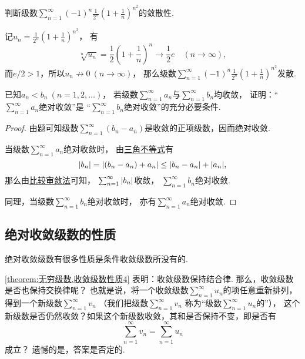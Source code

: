 \begin{example}
判断级数\(\sum_{n=1}^\infty (-1)^n \frac1{2^n} \left(1+\frac1n\right)^{n^2}\)的敛散性.
\begin{solution}
记\(u_n = \frac1{2^n} \left(1+\frac1n\right)^{n^2}\)，
有\[
	\sqrt[n]{u_n}
	= \frac12 \left(1+\frac1n\right)^n
	\to \frac12 e \quad(n\to\infty),
\]
而\(e/2>1\)，所以\(u_n \not\to 0\ (n\to\infty)\)，
那么级数\(\sum_{n=1}^\infty (-1)^n \frac1{2^n} \left(1+\frac1n\right)^{n^2}\)发散.
\end{solution}
\end{example}

\begin{example}
已知\(a_n < b_n\ (n=1,2,\dotsc)\)，
若级数\(\sum_{n=1}^\infty a_n\)与\(\sum_{n=1}^\infty b_n\)均收敛，
证明：“\(\sum_{n=1}^\infty a_n\)绝对收敛”是
“\(\sum_{n=1}^\infty b_n\)绝对收敛”的充分必要条件.
\begin{proof}
由题可知级数\(\sum_{n=1}^\infty (b_n - a_n)\)是收敛的正项级数，因而绝对收敛.

当级数\(\sum_{n=1}^\infty a_n\)绝对收敛时，
由\hyperref[theorem:不等式.三角不等式1]{三角不等式}有\[
	\abs{b_n} = \abs{(b_n - a_n) + a_n}
	\leq \abs{b_n - a_n} + \abs{a_n},
\]
那么由\hyperref[theorem:无穷级数.正项级数的比较审敛法]{比较审敛法}可知，
\(\sum_{n=1}^\infty \abs{b_n}\)收敛，
\(\sum_{n=1}^\infty b_n\)绝对收敛.

同理，当级数\(\sum_{n=1}^\infty b_n\)绝对收敛时，
亦有\(\sum_{n=1}^\infty a_n\)绝对收敛.
\end{proof}
\end{example}

\subsection{绝对收敛级数的性质}
绝对收敛级数有很多性质是条件收敛级数所没有的.

\cref{theorem:无穷级数.收敛级数性质4} 表明：收敛级数保持结合律.
那么，收敛级数是否也保持交换律呢？
也就是说，将一个收敛级数\(\sum_{n=1}^\infty u_n\)的项任意重新排列，
得到一个新级数\(\sum_{n=1}^\infty v_n\)
（我们把级数\(\sum_{n=1}^\infty v_n\)
称为“级数\(\sum_{n=1}^\infty u_n\)的”），
这个新级数是否仍然收敛？如果这个新级数收敛，其和是否保持不变，即是否有\[
	\sum_{n=1}^\infty v_n = \sum_{n=1}^\infty u_n
\]成立？
遗憾的是，答案是否定的.

